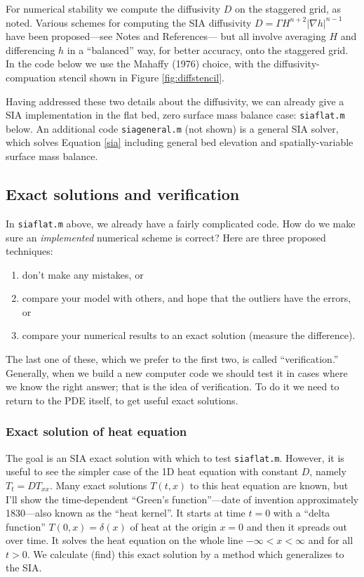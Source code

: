 \documentclass[titlepage,letterpaper,final,12pt]{scrartcl}
\newcommand{\grad}{\nabla}
\newcommand{\minput}[1]{
\bigskip
\begin{quote}
\bigskip
\VerbatimInput[frame=single,framesep=3mm,label=\fbox{\normalsize \textsl{\,#1.m\,}},fontfamily=courier,fontsize=\scriptsize]{../mfiles/#1.slim.m}
\bigskip
\end{quote}
}
\begin{document}
For numerical stability we compute the diffusivity $D$ on the staggered grid, as noted.  Various schemes for computing the SIA diffusivity $D = \Gamma H^{n+2} |\grad h|^{n-1}$ have been proposed---see Notes and References---
but all involve averaging $H$ and differencing $h$ in a ``balanced'' way, for better accuracy, onto the staggered grid.  In the code below we use the Mahaffy (1976) choice, with the diffusivity-compuation stencil shown in Figure \ref{fig:diffstencil}.

Having addressed these two details about the diffusivity, we can already give a SIA implementation in the flat bed, zero surface mass balance case: \texttt{siaflat.m} below.  An additional code \texttt{siageneral.m} (not shown) is a general SIA solver, which solves Equation \eqref{sia} including general bed elevation and spatially-variable surface mass balance.

\minput{siaflat}


\subsection{Exact solutions and verification}

In \texttt{siaflat.m} above, we already have a fairly complicated code.  How do we make sure an \emph{implemented} numerical scheme is correct?  Here are three proposed techniques:
\begin{enumerate}
  \item don't make any mistakes, or
  \item compare your model with others, and hope that the outliers have the errors, or
  \item compare your numerical results to an exact solution (measure the difference).   \end{enumerate}
The last one of these, which we prefer to the first two, is called ``verification.''
Generally, when we build a new computer code we should test it in cases where we know the right answer; that is the idea of verification.  To do it we need to return to the PDE itself, to get useful exact solutions.

\subsubsection*{Exact solution of heat equation}  The goal is an SIA exact solution with which to test \texttt{siaflat.m}.  However, it is useful to see the simpler case of the 1D heat equation with constant $D$, namely $T_t = D T_{xx}$.  Many exact solutions $T(t,x)$ to this heat equation are known, but I'll show the time-dependent ``Green's function''---date of invention approximately 1830---also known as the ``heat kernel''.  It starts at time $t=0$ with a ``delta function'' $T(0,x)=\delta(x)$ of heat at the origin $x=0$ and then it spreads out over time.  It solves the heat equation on the whole line $-\infty<x<\infty$ and for all $t>0$.  We calculate (find) this exact solution by a method which generalizes to the SIA.
\end{document}
